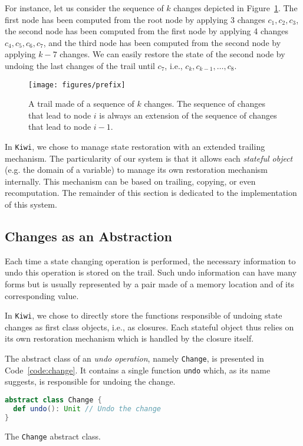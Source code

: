 \documentclass{llncs}
\newcommand{\fig}[1]{Figure~\ref{fig:#1}}
\begin{document}
For instance, let us consider the sequence of $k$ changes depicted in \fig{trailSeq}. 
The first node has been computed from the root node by applying 3 changes $c_1, c_2, c_3$,
the second node has been computed from the first node by applying 4 changes $c_4, c_5, c_6, c_7$, 
and the third node has been computed from the second node by applying $k-7$ changes. 
We can easily restore the state of the second node by undoing the last changes of the trail until $c_7$, i.e., $c_k, c_{k-1}, \dots, c_8$.


\begin{figure}
    \centering
    \texttt{[image: figures/prefix]}
    \caption{A trail made of a sequence of $k$ changes. The sequence of changes that lead to node $i$ is always an extension of the sequence of changes that lead to node $i-1$. }
    \label{fig:trailSeq}
\end{figure}

\noindent
In \texttt{Kiwi}, we chose to manage state restoration with an extended trailing mechanism. 
The particularity of our system is that it allows each \emph{stateful object} (e.g. the domain of a variable) to manage its own restoration mechanism internally. 
This mechanism can be based on trailing, copying, or even recomputation.
The remainder of this section is dedicated to the implementation of this system.

\subsection{Changes as an Abstraction}

Each time a state changing operation is performed, the necessary information to undo this operation is stored on the trail. 
Such undo information can have many forms but is usually represented by a pair made of a memory location and of its corresponding value. 

In \texttt{Kiwi}, we chose to directly store the functions responsible of undoing state changes as first class objects, i.e., as closures.
Each stateful object thus relies on its own restoration mechanism which is handled by the closure itself.

The abstract class of an \emph{undo operation}, namely \texttt{Change}, is presented in Code~\ref{code:change}. It contains a single function \texttt{undo} which, as its name suggests, is responsible for undoing the change. 
%
\begin{code}
\begin{lstlisting}[language=scala, style=lineNumber]
abstract class Change {
  def undo(): Unit // Undo the change
}
\end{lstlisting}
\caption{The \texttt{Change} abstract class.}
\label{code:change}
\end{code}
\end{document}
